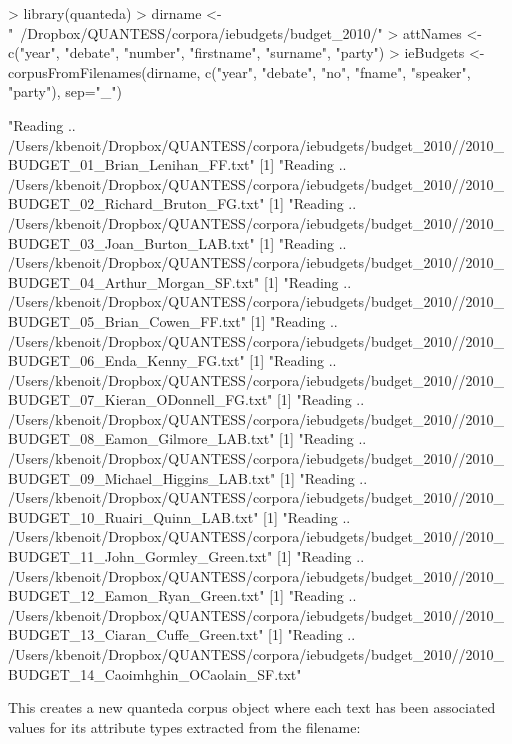 \documentclass{article}
\begin{document}
\begin{Schunk}
\begin{Sinput}
> library(quanteda)
> dirname <- "~/Dropbox/QUANTESS/corpora/iebudgets/budget_2010/"
> attNames <- c("year", "debate", "number", "firstname", "surname", "party")
> ieBudgets <- corpusFromFilenames(dirname, c("year", "debate", "no", "fname", "speaker", "party"), sep="_")
\end{Sinput}
\begin{Soutput}
[1] "Reading .. /Users/kbenoit/Dropbox/QUANTESS/corpora/iebudgets/budget_2010//2010_BUDGET_01_Brian_Lenihan_FF.txt"
[1] "Reading .. /Users/kbenoit/Dropbox/QUANTESS/corpora/iebudgets/budget_2010//2010_BUDGET_02_Richard_Bruton_FG.txt"
[1] "Reading .. /Users/kbenoit/Dropbox/QUANTESS/corpora/iebudgets/budget_2010//2010_BUDGET_03_Joan_Burton_LAB.txt"
[1] "Reading .. /Users/kbenoit/Dropbox/QUANTESS/corpora/iebudgets/budget_2010//2010_BUDGET_04_Arthur_Morgan_SF.txt"
[1] "Reading .. /Users/kbenoit/Dropbox/QUANTESS/corpora/iebudgets/budget_2010//2010_BUDGET_05_Brian_Cowen_FF.txt"
[1] "Reading .. /Users/kbenoit/Dropbox/QUANTESS/corpora/iebudgets/budget_2010//2010_BUDGET_06_Enda_Kenny_FG.txt"
[1] "Reading .. /Users/kbenoit/Dropbox/QUANTESS/corpora/iebudgets/budget_2010//2010_BUDGET_07_Kieran_ODonnell_FG.txt"
[1] "Reading .. /Users/kbenoit/Dropbox/QUANTESS/corpora/iebudgets/budget_2010//2010_BUDGET_08_Eamon_Gilmore_LAB.txt"
[1] "Reading .. /Users/kbenoit/Dropbox/QUANTESS/corpora/iebudgets/budget_2010//2010_BUDGET_09_Michael_Higgins_LAB.txt"
[1] "Reading .. /Users/kbenoit/Dropbox/QUANTESS/corpora/iebudgets/budget_2010//2010_BUDGET_10_Ruairi_Quinn_LAB.txt"
[1] "Reading .. /Users/kbenoit/Dropbox/QUANTESS/corpora/iebudgets/budget_2010//2010_BUDGET_11_John_Gormley_Green.txt"
[1] "Reading .. /Users/kbenoit/Dropbox/QUANTESS/corpora/iebudgets/budget_2010//2010_BUDGET_12_Eamon_Ryan_Green.txt"
[1] "Reading .. /Users/kbenoit/Dropbox/QUANTESS/corpora/iebudgets/budget_2010//2010_BUDGET_13_Ciaran_Cuffe_Green.txt"
[1] "Reading .. /Users/kbenoit/Dropbox/QUANTESS/corpora/iebudgets/budget_2010//2010_BUDGET_14_Caoimhghin_OCaolain_SF.txt"
\end{Soutput}
\end{Schunk}


This creates a new quanteda corpus object where each text has been associated values for its attribute types extracted from the filename:
\end{document}
